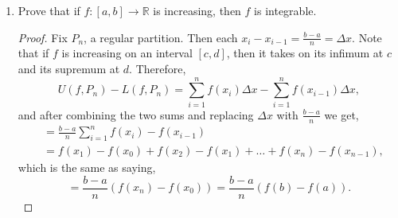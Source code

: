 \documentclass[12pt]{amsart}
\begin{document}
\begin{enumerate}
\begin{proof}
Let $P_n = \{ a + \tfrac {b-a} n i \}_{i=0}^n$ be a regular partition of $[a,b]$. Fix $i$ and consider $f$ on $[ x_{i-1}, x_i ]$. Since $f$ is increasing, we have that $m_i (f,P_n) = f(x_{i-1})$ and $M_i(f,P_n) = f(x_i)$. So:
%
\[ f(x_i) = f\left(a + \frac{(b-a)i}{n}\right) = \left(a + \frac{(b-a)i}{n}\right) = \frac {-ai + an + bi} n , \]
%
and,
%
\begin{align*}
f(x_{i-1}) &= f\left(a + \frac{(b-a)(i-1)}{n}\right) = \left(a + \frac{(b-a)(i-1)}{n}\right) \\
&= \frac {-ai + an + a + bi - b} n.
\end{align*}
%
Therefore,
%
\begin{align*}
U(f,P_n) &= \sum_{i=1}^n M_i(f,P_n) \Delta x = \sum_{i=1}^n \frac {-ai + an + bi} n \cdot \frac 1 n \\
&= \frac {an - a + bn + b} {2n}.
\end{align*}
%
Similarly,
%
\[ L(f,P_n) = \frac{an+a+bn-b}{2n}. \]
%
So $\inf\{ U(f,P_n) : n \in\mathbb N \} = b$ and $\sup\{ L(f,P_n) : n \in\mathbb N \} = a$.
\end{proof}

\item Prove that if $f : [a,b] \rightarrow \mathbb{R}$ is increasing, then $f$ is integrable.
%

\begin{proof}
Fix $P_n$, a regular partition. Then each $x_i - x_{i-1} = \tfrac{b-a}{n} = \Delta x$. Note that if $f$ is increasing on an interval $[c,d]$, then it takes on its infimum at $c$ and its supremum at $d$. Therefore,
%
\[ U(f, P_n) - L(f, P_n) = \sum_{i=1}^n f(x_i) \Delta x - \sum_{i=1}^n f(x_{i-1}) \Delta x, \]
%
and after combining the two sums and replacing $\Delta x$ with $\tfrac{b-a}{n}$ we get,
%
\begin{align*}
&= \frac{b-a}{n} \sum_{i=1}^n f(x_i) - f(x_{i-1}) \\
&= f(x_1) - f(x_0) + f(x_2) - f(x_1) + \ldots + f(x_n) - f(x_{n-1}),
\end{align*}
%
which is the same as saying,
%
\[ = \frac{b-a}{n} \left( f(x_n) - f(x_0) \right) = \frac{b-a}{n} \left( f(b) - f(a) \right). \]


\end{proof}
\end{enumerate}
\end{document}
